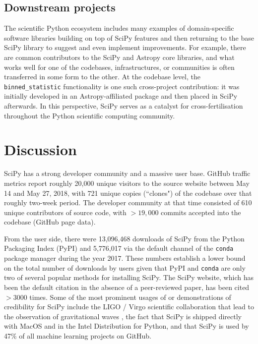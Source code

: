 \documentclass[fleqn,10pt]{wlscirep}
\begin{document}
\subsection*{Downstream projects}

The scientific Python ecosystem includes many examples
of domain-specific software libraries building on top
of SciPy features and then returning to the base SciPy library
to suggest and even implement improvements. 
For example, there are common contributors to the SciPy and 
Astropy core libraries\cite{astropy-2018}, and what works 
well for one of the codebases, infrastructures, or communities
is often transferred in some form to the other. At the codebase
level, the \texttt{binned\_statistic} functionality
is one such cross-project contribution: it was initially
developed in an Astropy-affiliated package
and then placed in SciPy afterwards. 
In this perspective, SciPy serves as a catalyst for cross-fertilisation 
throughout the Python scientific computing community.

\section*{Discussion}


SciPy has a strong developer community and a massive user base. GitHub traffic
metrics report roughly 20,000 unique visitors to the source website between May
14 and May 27, 2018, with 721 unique copies (``clones") of the codebase over
that roughly two-week period. The developer community at that time consisted of 610 unique
contributors of source code, with $>19,000$ commits accepted into the codebase
(GitHub page data).

From the user side, there were 13,096,468 downloads of SciPy from the Python
Packaging Index (PyPI)\cite{pypinfo} and 5,776,017 via the default channel of the
\texttt{conda}\cite{condainfo} package manager during the year 2017. These numbers establish a lower
bound on the total number of downloads by users given that
PyPI and \texttt{conda} are only two of several popular methods for installing SciPy.  The SciPy
website\cite{SciPylib}, which has been the default citation in the absence of a
peer-reviewed paper, has been cited $>3000$ times\cite{googlescholar}. Some of the most prominent
usages of or demonstrations of credibility for SciPy include the LIGO / Virgo
scientific collaboration that lead to the observation of gravitational waves
\cite{PhysRevLett.116.061102}, the fact that SciPy is shipped directly with
MacOS and in the Intel Distribution for Python\cite{intel-python}, and that SciPy is used
by 47\% of all machine learning projects on GitHub\cite{octoverse-scipy}.
\end{document}
